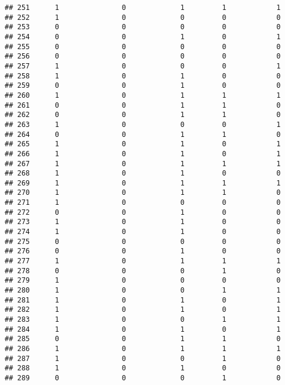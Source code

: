 \documentclass[]{article}
\begin{document}
\begin{verbatim}
## 251      1               0             1         1            1
## 252      1               0             0         0            0
## 253      0               0             0         0            0
## 254      0               0             1         0            1
## 255      0               0             0         0            0
## 256      0               0             0         0            0
## 257      1               0             0         0            1
## 258      1               0             1         0            0
## 259      0               0             1         0            0
## 260      1               0             1         1            1
## 261      0               0             1         1            0
## 262      0               0             1         1            0
## 263      1               0             0         0            1
## 264      0               0             1         1            0
## 265      1               0             1         0            1
## 266      1               0             1         0            1
## 267      1               0             1         1            1
## 268      1               0             1         0            0
## 269      1               0             1         1            1
## 270      1               0             1         1            0
## 271      1               0             0         0            0
## 272      0               0             1         0            0
## 273      1               0             1         0            0
## 274      1               0             1         0            0
## 275      0               0             0         0            0
## 276      0               0             1         0            0
## 277      1               0             1         1            1
## 278      0               0             0         1            0
## 279      1               0             0         0            0
## 280      1               0             0         1            1
## 281      1               0             1         0            1
## 282      1               0             1         0            1
## 283      1               0             0         1            1
## 284      1               0             1         0            1
## 285      0               0             1         1            0
## 286      1               0             1         1            1
## 287      1               0             0         1            0
## 288      1               0             1         0            0
## 289      0               0             0         1            0

\end{verbatim}
\end{document}
